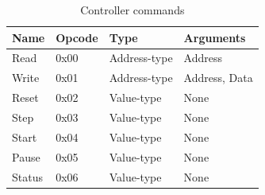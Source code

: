 \documentclass[main.tex]{subfiles}
\begin{document}
\setlength{\tabcolsep}{8pt}
\renewcommand{\arraystretch}{1.2}

\begin{table}[h]
    \footnotesize
    \caption{Controller commands}
    \label{tbl:opcodes-cmd}
    \centering
    \begin{tabular}{|l|l|l|l|}
        \hline
        \textbf{Name} & \textbf{Opcode} & \textbf{Type} & \textbf{Arguments}    \\ \hline
        Read          & 0x00            & Address-type  & Address               \\
        Write         & 0x01            & Address-type  & Address, Data         \\
        Reset         & 0x02            & Value-type    & None                  \\
        Step          & 0x03            & Value-type    & None                  \\
        Start         & 0x04            & Value-type    & None                  \\
        Pause         & 0x05            & Value-type    & None                  \\
        Status        & 0x06            & Value-type    & None                  \\ \hline
    \end{tabular}
\end{table}
\end{document}
